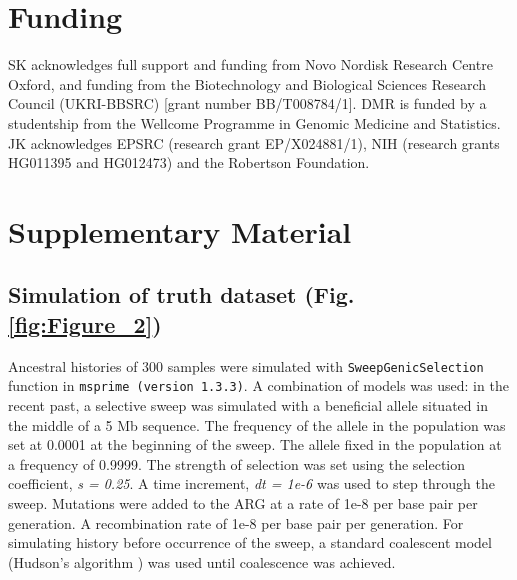 \documentclass[unnumsec,webpdf,contemporary,large,namedate]{oup-authoring-template}%
\begin{document}

\section*{Funding}
SK acknowledges full support and funding from Novo Nordisk Research Centre Oxford,
and funding from the Biotechnology and Biological Sciences Research Council 
(UKRI-BBSRC) [grant number BB/T008784/1]. DMR is funded by 
a studentship from the Wellcome Programme in Genomic Medicine and Statistics.
JK acknowledges EPSRC (research grant EP/X024881/1),
NIH (research grants HG011395 and HG012473)
and the Robertson Foundation.




\clearpage \onecolumn \setcounter{figure}{0}
\renewcommand{\thefigure}{S\arabic{figure}}

\section{Supplementary Material}
\subsection{Simulation of truth dataset (Fig. \ref{fig:Figure_2})}
\label{subsec:sweep_simulation}
Ancestral
histories of 300 samples were simulated with \texttt{SweepGenicSelection}
function in \texttt{msprime (version 1.3.3)}. A combination of models was used:
in the recent past, a selective sweep was simulated with a beneficial allele
situated in the middle of a 5 Mb sequence. The frequency of the allele in the
population was set at 0.0001 at the beginning of the sweep. The allele fixed in
the population at a frequency of 0.9999. The strength of selection was set
using the selection coefficient, \textit{s = 0.25}. A time increment,
\textit{dt = 1e-6} was used to step through the sweep. Mutations were added to
the ARG at a rate of 1e-8 per base pair per generation. A recombination rate of 1e-8 per base pair per generation. For simulating history before occurrence of the
sweep, a standard coalescent model (Hudson's algorithm \citep{Hudson1983}) was
used until coalescence was achieved.
\end{document}
